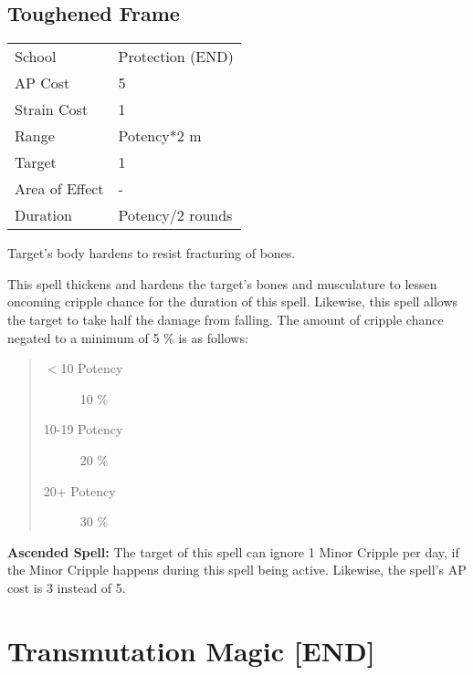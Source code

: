 \documentclass[11pt,a4paper,twocolumn]{book}
\begin{document}
\subsection*{Toughened Frame}
{
	\begin{tabu} to 75mm{| X[l,4] | X[l,7] |}
		\hline
		School 			& Protection (END) 				\\
		AP Cost	      	& 5 							\\
		Strain Cost     & 1 							\\
		Range     		& Potency*2 m					\\
		Target      	& 1								\\
		Area of Effect  & - 	 						\\
		Duration     	& Potency/2 rounds				\\ \hline
	\end{tabu}
	
}

\medskip

Target's body hardens to resist fracturing of bones.

This spell thickens and hardens the target's bones and musculature to lessen oncoming cripple chance for the duration of this spell. Likewise, this spell allows the target to take half the damage from falling. The amount of cripple chance negated to a minimum of 5 \% is as follows:

\begin{quote}
	\begin{description}
		\item[$<$10 Potency] 	10 \%
		\item[10-19 Potency] 	20 \%
		\item[20+ Potency] 		30 \%
	\end{description}
\end{quote}

\bigskip

\textbf{Ascended Spell:} The target of this spell can ignore 1 Minor Cripple per day, if the Minor Cripple happens during this spell being active. Likewise, the spell's AP cost is 3 instead of 5.



\section*{Transmutation Magic [END]}
\end{document}
